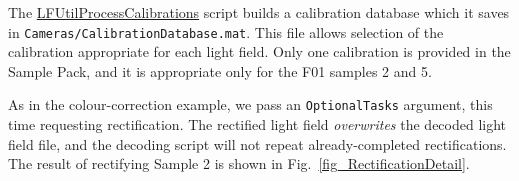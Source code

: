 \documentclass[onecolumn]{article}
\newcommand{\CiteFunction}[1]{\hyperlink{#1}{\small #1}}
\newcommand{\SymbolText}[1]{\texttt{\small #1}}
\begin{document}
\begin{enumerate}[leftmargin=1.5em,rightmargin=0.5cm]
The \CiteFunction{LFUtilProcessCalibrations} script builds a calibration database which it saves in \SymbolText{Cameras/CalibrationDatabase.mat}. This file allows selection of the calibration appropriate for each light field. Only one calibration is provided in the Sample Pack, and it is appropriate only for the F01 samples 2 and 5. 

As in the colour-correction example, we pass an \SymbolText{OptionalTasks} argument, this time requesting rectification. The rectified light field \emph{overwrites} the decoded light field file, and the decoding script will not repeat already-completed rectifications. The result of rectifying Sample 2 is shown in Fig.~\ref{fig_RectificationDetail}.

\end{enumerate}


\end{document}
